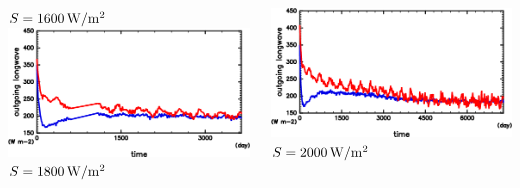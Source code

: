 \documentclass[aspectratio=149,9pt,fleqn]{beamer}
\begin{document}
\begin{frame}
\begin{columns}[T]
\begin{column}{.3\textwidth}
			\(S=1600\hmu{W/m^2}\)\\
			\includegraphics[width=\textwidth]{S1800/S1800_OLRA-OSRA_horimean_time0.0-3650.0-crop.png}
			\(S=1800\hmu{W/m^2}\)
		\end{column}
		\begin{column}{.3\textwidth}
			\centering
			\includegraphics[width=\textwidth]{S2000/S2000_OLRA-OSRA_horimean_time0.0-7300.0-crop.png}
			\(S=2000\hmu{W/m^2}\)
		\end{column}
	\end{columns}
\end{frame}
\end{document}
